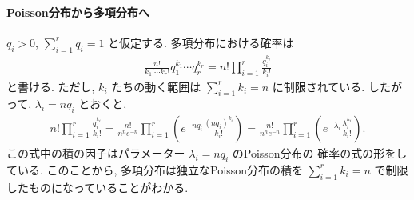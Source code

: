 \documentclass[12pt,twoside]{jarticle}
\theoremstyle{jplain}
\theoremstyle{jplain}
\theoremstyle{jplain}
\numberwithin{theorem}{section}
\numberwithin{equation}{section}
\numberwithin{figure}{section}
\numberwithin{table}{section}
\begin{document}
\paragraph{Poisson分布から多項分布へ}
$q_i>0$, $\sum_{i=1}^r q_i=1$ と仮定する.
多項分布における確率は
\begin{align*}
\frac{n!}{k_1!\cdots k_r!} q_1^{k_1}\cdots q_r^{k_r}
=n!\prod_{i=1}^r \frac{q_i^{k_i}}{k_i!}
\end{align*}
と書ける. ただし, $k_i$ たちの動く範囲は $\sum_{i=1}^r k_i=n$ に制限されている.
したがって, $\lambda_i=nq_i$ とおくと,
\begin{align*}
n!\prod_{i=1}^r \frac{q_i^{k_i}}{k_i!}
=\frac{n!}{n^n e^{-n}}
\prod_{i=1}^r \left( e^{-nq_i}\frac{(nq_i)^{k_i}}{k_i!} \right)
=\frac{n!}{n^n e^{-n}}
\prod_{i=1}^r \left( e^{-\lambda_i}\frac{\lambda_i^{k_i}}{k_i!} \right).
\end{align*}
この式中の積の因子はパラメーター $\lambda_i=nq_i$ のPoisson分布の
確率の式の形をしている.
このことから, 多項分布は独立なPoisson分布の積を $\sum_{i=1}^r k_i=n$
で制限したものになっていることがわかる.
\end{document}
